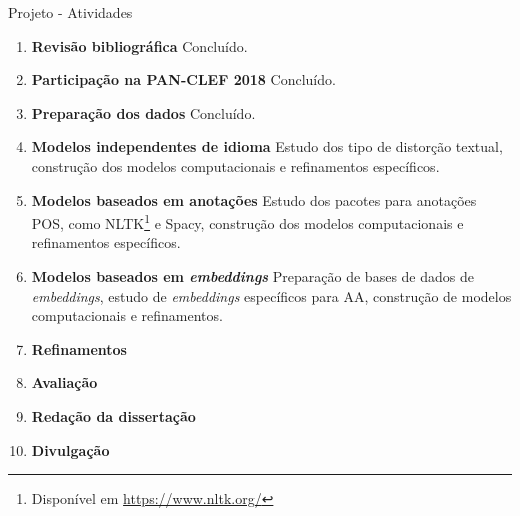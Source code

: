 \begin{frame}{Projeto - Atividades}

\begin{enumerate}
	\item {\bf Revisão bibliográfica} Concluído.
	
	\item {\bf Participação na PAN-CLEF 2018} Concluído.
	
	\item {\bf Preparação dos dados} Concluído.
	
	\item {\bf Modelos independentes de idioma} Estudo dos tipo de distorção textual, construção dos modelos computacionais e refinamentos específicos.
	
	\item {\bf Modelos baseados em anotações} Estudo dos pacotes para anotações POS, como NLTK\footnote{Disponível em  \url{https://www.nltk.org/}} e Spacy, construção dos modelos computacionais e refinamentos específicos.
	
	\item {\bf Modelos baseados em {\it embeddings}} Preparação de bases de dados de {\it embeddings}, estudo de {\it embeddings} específicos para AA, construção de modelos computacionais e refinamentos.
	
	\item {\bf Refinamentos} 
	
	\item {\bf Avaliação}
	
	\item {\bf Redação da dissertação} 
	
	\item {\bf Divulgação} 
\end{enumerate}
\end{frame}

